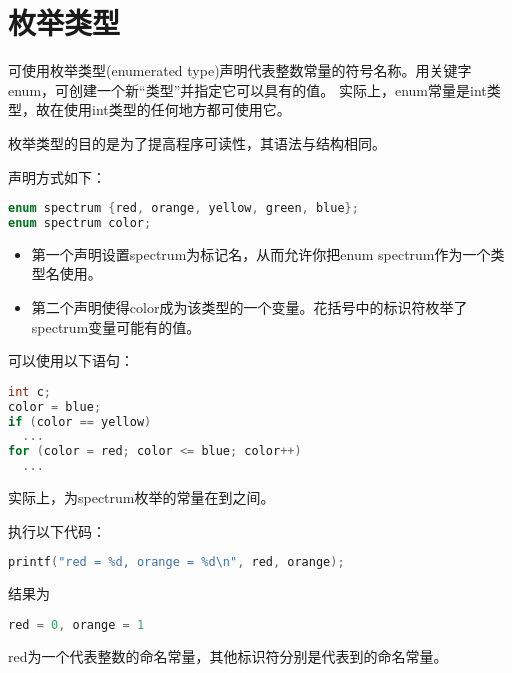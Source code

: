 \section{枚举类型}

\begin{frame}[fragile]\ft{\secname}
可使用枚举类型{\tf (enumerated type)}声明代表整数常量的符号名称。用关键字{\tf enum}，可创建一个新“类型”并指定它可以具有的值。
实际上，{\tf enum}常量是{\tf int}类型，故在使用{\tf int}类型的任何地方都可使用它。\vspace{0.1in}

枚举类型的目的是为了提高程序可读性，其语法与结构相同。
\end{frame}

\begin{frame}[fragile]\ft{\secname}
  声明方式如下：
  \begin{lstlisting}[language=c,backgroundcolor=\color{red!20}]
enum spectrum {red, orange, yellow, green, blue};
enum spectrum color;
  \end{lstlisting}
  \begin{itemize}
  \item 第一个声明设置{\tf spectrum}为标记名，从而允许你把{\tf enum spectrum}作为一个类型名使用。\\[0.1in]
  \item 第二个声明使得{\tf color}成为该类型的一个变量。花括号中的标识符枚举了{\tf spectrum}变量可能有的值。
  \end{itemize}
\end{frame}

\begin{frame}[fragile]\ft{\secname}
可以使用以下语句：
  \begin{lstlisting}[language=c,backgroundcolor=\color{red!20}]
int c;
color = blue;
if (color == yellow)
  ...
for (color = red; color <= blue; color++)
  ...
  \end{lstlisting}
实际上，为{\tf spectrum}枚举的常量在{}到{}之间。
\end{frame}

\begin{frame}[fragile]\ft{\secname}
执行以下代码：
  \begin{lstlisting}[language=c,backgroundcolor=\color{red!20}]
printf("red = %d, orange = %d\n", red, orange);
  \end{lstlisting}
结果为
  \begin{lstlisting}[language=c,backgroundcolor=\color{red!20}]
red = 0, orange = 1
  \end{lstlisting}
{\tf red}为一个代表整数{}的命名常量，其他标识符分别是代表{}到{}的命名常量。
\end{frame}

